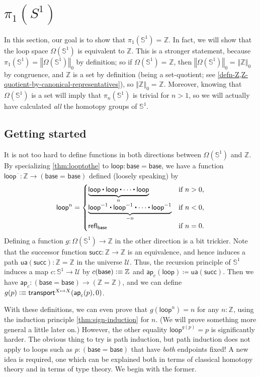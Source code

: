 \documentclass[10pt,a4paper]{article}
\providecommand{\index}[1]{}
\newcommand{\defeq}{\vcentcolon\equiv}  %
\newcommand{\id}[3][]{\ensuremath{#2 =_{#1} #3}\xspace}
\newcommand{\defid}{\coloneqq}
\newcommand{\refl}[1]{\ensuremath{\mathsf{refl}_{#1}}\xspace}
\newcommand{\ct}{%
  \mathchoice{\mathbin{\raisebox{0.5ex}{$\displaystyle\centerdot$}}}%
             {\mathbin{\raisebox{0.5ex}{$\centerdot$}}}%
             {\mathbin{\raisebox{0.25ex}{$\scriptstyle\,\centerdot\,$}}}%
             {\mathbin{\raisebox{0.1ex}{$\scriptscriptstyle\,\centerdot\,$}}}
}
\newcommand{\opp}[1]{\mathord{{#1}^{-1}}}
\newcommand{\transfib}[3]{\ensuremath{\mathsf{transport}^{#1}(#2,#3)\xspace}}
\newcommand{\mapfunc}[1]{\ensuremath{\mathsf{ap}_{#1}}\xspace} %
\let\apfunc\mapfunc
\newcommand{\UU}{\ensuremath{\mathcal{U}}\xspace}
\let\type\UU
\newcommand{\ua}{\ensuremath{\mathsf{ua}}\xspace} %
\newcommand{\trunc}[2]{\mathopen{}\left\Vert #2\right\Vert_{#1}\mathclose{}}
\newcommand{\Sn}{\mathbb{S}}
\newcommand{\base}{\ensuremath{\mathsf{base}}\xspace}
\newcommand{\lloop}{\ensuremath{\mathsf{loop}}\xspace}
\newcommand{\blank}{\mathord{\hspace{1pt}\text{--}\hspace{1pt}}}
\newcommand{\Z}{\ensuremath{\mathbb{Z}}\xspace}
\newcommand{\Zsuc}{\mathsf{succ}}
\theoremstyle{definition}
\theoremstyle{remark}
\numberwithin{equation}{section}
\begin{document}
\section{\texorpdfstring{$\pi_1(S^1)$}{π₁(S¹)}}
\label{sec:pi1-s1-intro}

In this section, our goal is to show that $\id {\pi_1(\Sn ^1)} {\Z}$.
In fact, we will show that the loop space\index{loop space} ${\Omega(\Sn ^1)}$ is equivalent to $\Z$.
This is a stronger statement, because $\id{\pi_1(\Sn ^1)} {\trunc 0 {\Omega(\Sn ^1)}}$ by
definition; so if $\id {\Omega(\Sn ^1)} {\Z}$, then $\id {\trunc
  0 {\Omega(\Sn ^1)}} {\trunc 0 {\Z}}$ by congruence, and
$\Z$ is a set by definition (being a set-quotient; see \cref{defn-Z,Z-quotient-by-canonical-representatives}), so $\id {\trunc 0 {\Z}} {\Z}$.
Moreover, knowing that ${\Omega(\Sn ^1)}$ is a set will imply that $\pi_n(\Sn^1)$ is trivial for $n>1$, so we will actually have calculated \emph{all} the homotopy groups of $\Sn^1$.

\subsection{Getting started}
\label{sec:pi1s1-initial-thoughts}

It is not too hard to define functions in both directions between $\Omega(\Sn^1)$ and \Z.
By specializing \cref{thm:looptothe} to $\lloop:\base=\base$, we have a function $\lloop^{\blank} : \Z \rightarrow (\id{\base}{\base})$ defined (loosely speaking) by
\[
  \lloop^n =
  \begin{cases}
    \underbrace{\lloop \ct \lloop \ct \cdots \ct \lloop}_{n}  & \text{if $n > 0$,} \\
    \underbrace{\opp \lloop \ct \opp \lloop \ct \cdots \ct \opp \lloop}_{-n} & \text{if $n < 0$,} \\
    \refl{\base} & \text{if $n = 0$.}
\end{cases}
\]
%
Defining a function $g:\Omega(\Sn^1)\to\Z$ in the other direction is a bit trickier.
Note that the successor function $\Zsuc:\Z\to\Z$ is an equivalence,
\index{successor!isomorphism on Z@isomorphism on $\Z$}%
and hence induces a path $\ua(\Zsuc):\Z=\Z$ in the universe \type.
Thus, the recursion principle of $\Sn^1$ induces a map $c:\Sn^1\to\type$ by $c(\base)\defeq \Z$ and $\apfunc c (\lloop) \defid \ua(\Zsuc)$.
Then we have $\apfunc{c} : (\base=\base) \to (\Z=\Z)$, and we can define $g(p)\defeq \transfib{X\mapsto X}{\apfunc{c}(p)}{0}$.

With these definitions, we can even prove that $g(\lloop^n)=n$ for any $n:\Z$, using the induction principle \cref{thm:sign-induction} for $n$.
(We will prove something more general a little later on.)
However, the other equality $\lloop^{g(p)}=p$ is significantly harder.
The obvious thing to try is path induction, but path induction does not apply to loops such as $p:(\base=\base)$ that have \emph{both} endpoints fixed!
A new idea is required, one which can be explained both in terms of classical homotopy theory and in terms of type theory.
We begin with the former.
\end{document}
